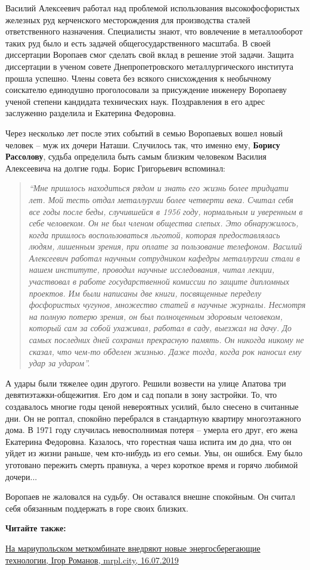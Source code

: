 Василий Алексеевич работал над проблемой использования высокофосфористых
железных руд керченского месторождения для производства сталей ответственного
назначения. Специалисты знают, что вовлечение в металлооборот таких руд было и
есть задачей общегосударственного масштаба. В своей диссертации Воропаев смог
сделать свой вклад в решение этой задачи. Защита диссертации в ученом совете
Днепропетровского металлургического института прошла успешно. Члены совета без
всякого снисхождения к необычному соискателю единодушно проголосовали за
присуждение инженеру Воропаеву ученой степени кандидата технических наук.
Поздравления в его адрес заслуженно разделила и Екатерина Федоровна.

Через несколько лет после этих событий в семью Воропаевых вошел новый человек –
муж их дочери Наташи. Случилось так, что именно ему, \textbf{Борису Рассолову}, судьба
определила быть самым близким человеком Василия Алексеевича на долгие годы.
Борис Григорьевич вспоминал:

\begin{quote}
\em
\enquote{Мне пришлось находиться рядом и знать его жизнь более тридцати лет. Мой тесть
отдал металлургии более четверти века. Считал себя все годы после беды,
случившейся в 1956 году, нормальным и уверенным в себе человеком. Он не был
членом общества слепых. Это обнаружилось, когда пришлось воспользоваться
льготой, которая предоставлялась людям, лишенным зрения, при оплате за
пользование телефоном. Василий Алексеевич работал научным сотрудником кафедры
металлургии стали в нашем институте, проводил научные исследования, читал
лекции, участвовал в работе государственной комиссии по защите дипломных
проектов. Им были написаны две книги, посвященные переделу фосфористых чугунов,
множество статей в научные журналы. Несмотря на полную потерю зрения, он был
полноценным здоровым человеком, который сам за собой ухаживал, работал в саду,
выезжал на дачу. До самых последних дней сохранил прекрасную память. Он никогда
никому не сказал, что чем-то обделен жизнью. Даже тогда, когда рок наносил ему
удар за ударом}.
\end{quote}

А удары были тяжелее один другого. Решили возвести на улице Апатова три
девятиэтажки-общежития. Его дом и сад попали в зону застройки. То, что
создавалось многие годы ценой невероятных усилий, было снесено в считанные дни.
Он не роптал, спокойно перебрался в стандартную квартиру многоэтажного дома. В
1971 году случилась невосполнимая потеря – умерла его друг, его жена Екатерина
Федоровна. Казалось, что горестная чаша испита им до дна, что он уйдет из жизни
раньше, чем кто-нибудь из его семьи. Увы, он ошибся. Ему было уготовано
пережить смерть правнука, а через короткое время и горячо любимой дочери...

Воропаев не жаловался на судьбу. Он оставался внешне спокойным. Он считал себя
обязанным поддержать в горе своих близких.

\textbf{Читайте также:} 

\href{https://mrpl.city/news/view/na-mariupolskom-metkombinate-vnedryayut-novye-e-nergosberegayushhie-tehnologii}{%
На мариупольском меткомбинате внедряют новые энергосберегающие технологии, Ігор Романов, mrpl.city, 16.07.2019}

